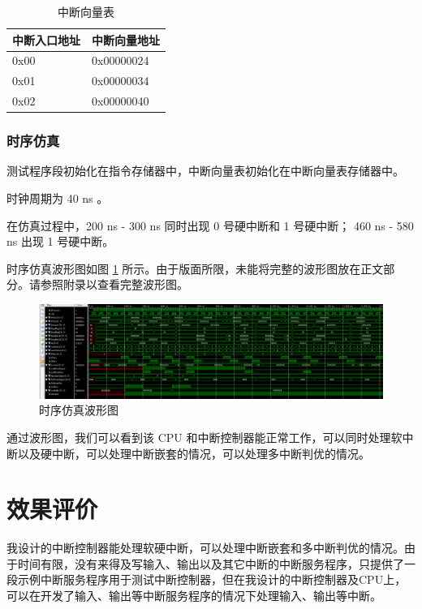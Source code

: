 \documentclass{article}
\begin{document}
\begin{table}[!h]
\centering
\begin{tabular}{|l|l|}
\hline
中断入口地址 & 中断向量地址 \\
\hline
0x00 & 0x00000024 \\
\hline
0x01 & 0x00000034 \\
\hline
0x02 & 0x00000040 \\
\hline
\end{tabular}
\caption{中断向量表}
\label{T2}
\end{table}

\subsubsection{时序仿真}

测试程序段初始化在指令存储器中，中断向量表初始化在中断向量表存储器中。

时钟周期为 40 ns 。

在仿真过程中，200 ns - 300 ns 同时出现 0 号硬中断和 1 号硬中断； 460 ns - 580 ns 出现 1 号硬中断。

时序仿真波形图如图 \ref{B1} 所示。由于版面所限，未能将完整的波形图放在正文部分。请参照附录以查看完整波形图。

\begin{figure}
\centering
\includegraphics[scale=0.24]{../pics/img_full_1.png}
\caption{时序仿真波形图}
\label{B1}
\end{figure}

通过波形图，我们可以看到该 CPU 和中断控制器能正常工作，可以同时处理软中断以及硬中断，可以处理中断嵌套的情况，可以处理多中断判优的情况。

\section{效果评价}

我设计的中断控制器能处理软硬中断，可以处理中断嵌套和多中断判优的情况。由于时间有限，没有来得及写输入、输出以及其它中断的中断服务程序，只提供了一段示例中断服务程序用于测试中断控制器，但在我设计的中断控制器及CPU上，可以在开发了输入、输出等中断服务程序的情况下处理输入、输出等中断。
\end{document}
